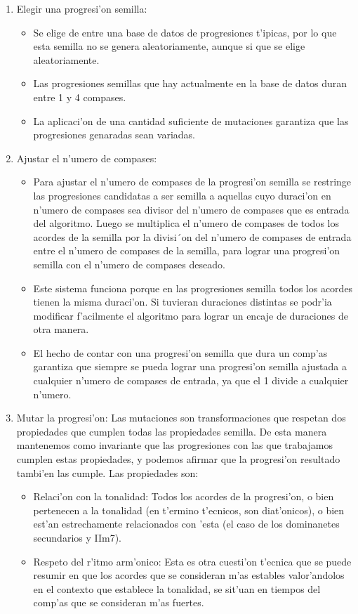 \begin{enumerate}
\item Elegir una progresi'on semilla: 
        \begin{itemize}
        \item Se elige de entre una base de datos de progresiones t'ipicas, por lo que esta semilla no se genera aleatoriamente, aunque si que se elige aleatoriamente.
        \item Las progresiones semillas que hay actualmente en la base de datos duran entre 1 y 4 compases.
        \item La aplicaci'on de una cantidad suficiente de mutaciones garantiza que las progresiones genaradas sean variadas.
        \end{itemize}       
\item Ajustar el n'umero de compases:
        \begin{itemize}
        \item Para ajustar el n'umero de compases de la progresi'on semilla se restringe las progresiones candidatas a ser semilla a aquellas cuyo duraci'on en n'umero de compases sea divisor del n'umero de compases que es entrada del algoritmo. Luego se multiplica el n'umero de compases de todos los acordes de la semilla por la divisi´on del n'umero de compases de entrada entre el n'umero de compases de la semilla, para lograr una progresi'on semilla con el n'umero de compases deseado.
        \item Este sistema funciona porque en las progresiones semilla todos los acordes tienen la misma duraci'on. Si tuvieran duraciones distintas se podr'ia modificar f'acilmente el algoritmo para lograr un encaje de duraciones de otra manera.
        \item El hecho de contar con una progresi'on semilla que dura un comp'as garantiza que siempre se pueda lograr una progresi'on semilla ajustada a cualquier n'umero de compases de entrada, ya que el 1 divide a cualquier n'umero.
        \end{itemize}       
\item Mutar la progresi'on: Las mutaciones son transformaciones que respetan dos propiedades que cumplen todas las propiedades semilla. De esta manera mantenemos como invariante que las progresiones con las que trabajamos cumplen estas propiedades, y podemos afirmar que la progresi'on resultado tambi'en las cumple. Las propiedades son:

        \begin{itemize}
        \item Relaci'on con la tonalidad: Todos los acordes de la progresi'on, o bien pertenecen a la tonalidad (en t'ermino t'ecnicos, son diat'onicos), o bien est'an estrechamente relacionados con 'esta (el caso de los dominanetes secundarios y IIm7). 
        \item Respeto del r'itmo arm'onico: Esta es otra cuesti'on t'ecnica que se puede resumir en que los acordes que se consideran m'as estables valor'andolos en el contexto que establece la tonalidad, se sit'uan en tiempos del comp'as que se consideran m'as fuertes.
        \end{itemize}


\end{enumerate}
